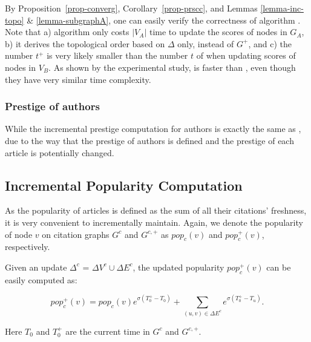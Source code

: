 By Proposition~\ref{prop-converg}, Corollary~\ref{prop-prscc}, and Lemmas \ref{lemma-inc-topo} \& \ref{lemma-subgraphA}, one can easily verify the correctness of algorithm \inctwprscc.
%
Note that  a) algorithm \inctwprscc only costs $|V_A|$ time to update the scores of nodes in $G_A$, b) it derives the topological order based  on $\Delta$ only, instead of $G^{+}$, and c) the number $t^+$ is very likely smaller than the number $t$ of \twprscc when updating scores of nodes in $V_B$. As shown by the experimental study, \inctwprscc is faster than \twprscc, even though they have very similar time complexity.

\subsubsection{Prestige of authors}
\label{subsubsec-incprs-A}
While the incremental prestige computation for authors is exactly the same as \batensemble, due to the way that the prestige of authors is defined and the prestige of each article is potentially changed.


\subsection{Incremental Popularity Computation}
\label{subsec-incpop}

As the popularity of articles is defined as the sum of all their citations' freshness, it is very convenient to incrementally maintain. Again, we denote the popularity of node $v$ on citation graphs $G^c$ and $G^{c,+}$ as $pop_c(v)$ and $pop_c^+(v)$, respectively.

Given an update $\Delta^c$ = $\Delta V^c\cup\Delta E^c$, the updated popularity $pop_{c}^+(v)$ can be easily computed as:
\begin{small}
\begin{equation}\label{eq-inc-pop}
pop_c^+(v) = pop_c(v) {e^{\sigma (T^+_0-T_0)}} + \sum_{(u,v)\in \Delta E^c} {e^{\sigma (T^+_0-T_u)}}.
\end{equation}
\end{small}

\vspace{-1ex}
\noindent
Here $T_0$ and $T^+_0$ are the current time in $G^c$ and $G^{c,+}$.


